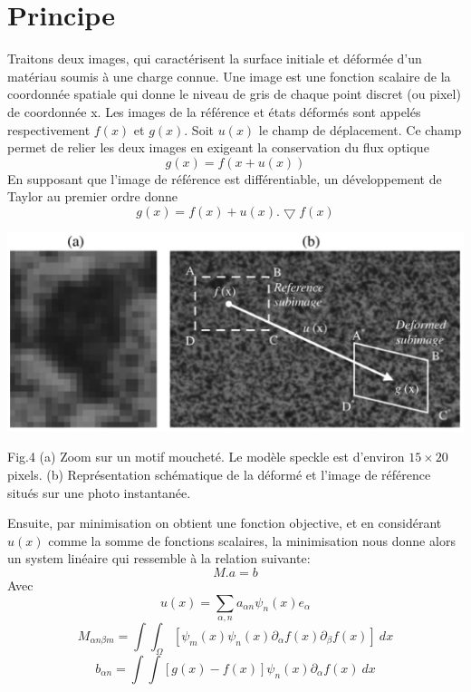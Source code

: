 \documentclass[12pt]{report}
\begin{document}
\section{Principe}
Traitons deux images, qui caractérisent la surface initiale et déformée d'un
matériau soumis à une charge connue. Une image est une fonction scalaire de la coordonnée
spatiale qui donne le niveau de gris de chaque point discret (ou pixel) de coordonnée x. Les
images de la référence et états déformés sont appelés respectivement $f(x)$ et $g(x)$. Soit $u(x)$ le
champ de déplacement. Ce champ permet de relier les deux images en exigeant la conservation
du flux optique
\[g(x)=f(x+u(x))\]
En supposant que l'image de référence est différentiable, un développement de Taylor au premier
ordre donne
\[g(x)=f(x)+u(x).\bigtriangledown f(x)\]
\begin{center}
\includegraphics[scale=0.5]{Fig_4}
\end{center}
\begin{center}
\caption{Fig.4 (a) Zoom sur un motif moucheté. Le modèle speckle est d'environ $15\times 20$ pixels. (b) Représentation schématique de la déformé et l'image de référence situés sur une photo instantanée.}
\end{center}
Ensuite, par minimisation on obtient une fonction objective, et en considérant $u(x)$ comme
la somme de fonctions scalaires, la minimisation nous donne alors un system linéaire qui
ressemble à la relation suivante:
\[M.a=b\]
Avec
\[u(x)=\sum_{\alpha,n} a_{\alpha n}\psi_n(x)e_\alpha \]
\[M_{\alpha n \beta m}=\int{\int_{\Omega} {[\psi_m(x)\psi_n(x)\partial_\alpha f(x)\partial_\beta f(x)]\ dx}}\]
\[b_{\alpha n}=\int{\int{[g(x)-f(x)]\psi_n(x)\partial_\alpha f(x)\ dx}}\]
\end{document}
